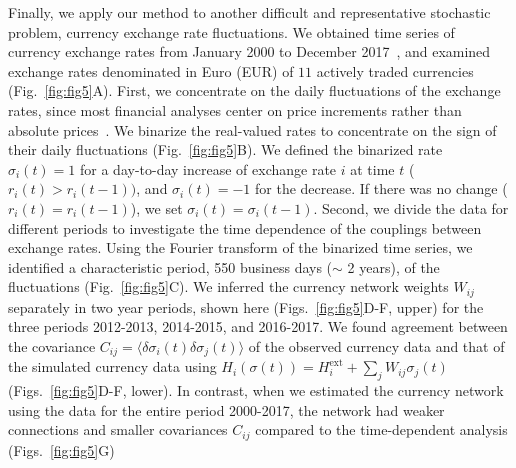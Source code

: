 \documentclass[prx,twocolumn,twoside,showpacs,superscriptaddress]{revtex4-1}
\begin{document}
Finally, we apply our method to another difficult and representative stochastic problem, currency exchange rate fluctuations.
We obtained time series of currency exchange rates from January 2000 to December 2017~\cite{BankItaly}, and examined exchange rates denominated in Euro (EUR) %
of $11$ actively traded currencies (Fig.~\ref{fig:fig5}A). %
First, we concentrate on the daily fluctuations of the exchange rates, since most financial analyses center on price increments rather than absolute prices~\cite{Pincus2004}.
We binarize the real-valued rates to concentrate on the sign of their daily fluctuations (Fig.~\ref{fig:fig5}B).
We defined the binarized rate $\sigma_i(t)=1$ for a day-to-day increase of exchange rate $i$ at time $t$ ($r_i(t) > r_i(t-1))$,
and $\sigma_i(t)=-1$ for the decrease. If there was no change ($r_i(t) = r_i(t-1)$), we set $\sigma_i(t)=\sigma_i(t-1)$.
Second, we divide the data for different periods to investigate the time dependence of the couplings between exchange rates.
Using the Fourier transform of the binarized time series, we identified a characteristic period, 550 business days ($\sim$ 2 years), of the fluctuations (Fig.~\ref{fig:fig5}C). 
We inferred the currency network weights $W_{ij}$ separately in two year periods, shown here (Figs.~\ref{fig:fig5}D-F, upper) for the three periods  2012-2013, 2014-2015, and 2016-2017.
We found agreement between the covariance $C_{ij}=\langle \delta \sigma_i(t) \delta \sigma_j(t) \rangle$ of the observed currency data and that of the simulated currency data using $H_i(\sigma(t))=H_{i}^{\textrm{ext}} + \sum_{j} W_{ij}\sigma_{j}(t)$ (Figs.~\ref{fig:fig5}D-F, lower).
In contrast, when we estimated the currency network using the data for the entire period 2000-2017, the network had weaker connections and smaller covariances $C_{ij}$ compared to the time-dependent analysis (Figs.~\ref{fig:fig5}G)
\end{document}
